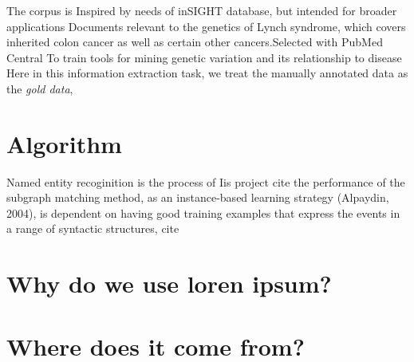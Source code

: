 The corpus is Inspired by needs of inSIGHT database, but intended for broader applications Documents relevant to the genetics of Lynch syndrome, which covers inherited colon cancer as well as certain other cancers.Selected with PubMed Central To train tools for mining genetic variation and its relationship to disease
Here in this information extraction task, we treat the manually annotated data as the \emph{gold data}, 
\section{Algorithm}
Named entity recoginition is the process of 
Iis project 
cite
the performance of the subgraph matching method, as an instance-based learning strategy (Alpaydin, 2004), is dependent on having good training examples that express the events in a range of syntactic structures, cite

\section{Why do we use loren ipsum?} %


\section{Where does it come from?}  %
\label{section1.3}
